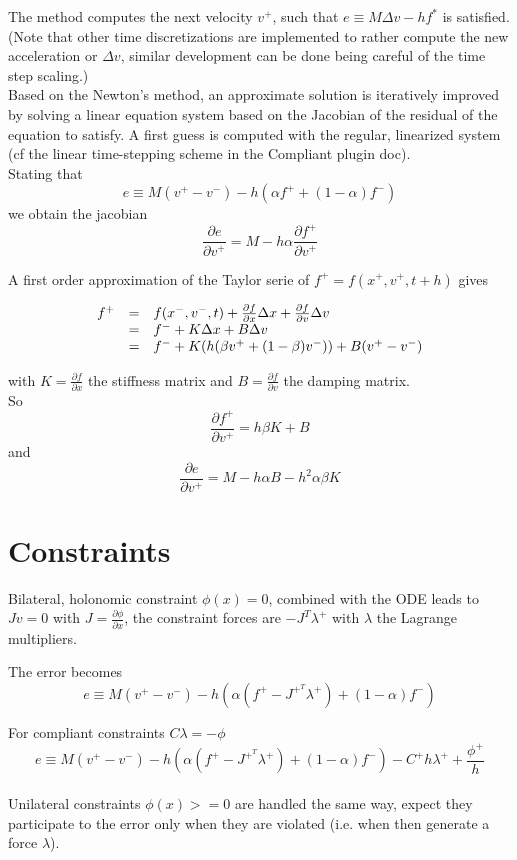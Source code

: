 \documentclass{article}
\newcommand{\ddd}[2]{\frac{\partial #1}{\partial #2}}
\newcommand{\p}[1]{#1^{+}}
\newcommand{\m}[1]{#1^{-}}
\newcommand{\s}[1]{#1^{*}}
\newcommand{\xp}{\p{x}}
\newcommand{\xm}{\m{x}}
\newcommand{\vp}{\p{v}}
\newcommand{\vm}{\m{v}}
\newcommand{\fp}{\p{f}}
\newcommand{\fm}{\m{f}}
\newcommand{\fs}{\s{f}}
\newcommand{\Dx}{\Delta x}
\newcommand{\Dv}{\Delta v}
\newcommand{\lambdap}{\p{\lambda}}
\newcommand{\phip}{\p{\phi}}
\newcommand{\JpT}{J^{+^T}}
\newcommand{\Cp}{\p{C}}
\begin{document}
The method computes the next velocity $\vp$, such that $e \equiv M\Dv-h\fs$ is satisfied.
(Note that other time discretizations are implemented to rather compute the new acceleration or $\Dv$, similar development can be done being careful of the time step scaling.)\\


Based on the Newton's method, an approximate solution is iteratively improved by solving a linear equation system based on the Jacobian of the residual of the equation to satisfy.
A first guess is computed with the regular, linearized system (cf the linear time-stepping scheme in the Compliant plugin doc). \\


Stating that \[ e \equiv M(\vp-\vm)-h(\alpha\fp+(1-\alpha)\fm)\] we obtain the jacobian \[ \ddd{e}{\vp}=M-h\alpha\ddd{\fp}{\vp}\]

A first order approximation of the Taylor serie of $\fp=f(\xp,\vp,t+h)$ gives

\[
   \begin{array}{r c l}
      \fp  & = & f(\xm,\vm,t)+\ddd{f}{x}\Dx+\ddd{f}{v}\Dv \\
           & = & \fm+K\Dx+B\Dv \\
           & = & \fm+K(h(\beta\vp+(1-\beta)\vm))+B(\vp-\vm)
   \end{array}
\]

with $K=\ddd{f}{x}$ the stiffness matrix and $B=\ddd{f}{v}$ the damping matrix. \\


So \[ \ddd{\fp}{\vp}=h\beta K+B\] and \[\ddd{e}{\vp}=M-h\alpha B-h^2\alpha\beta K\]


\section{Constraints}


Bilateral, holonomic constraint $\phi(x)=0$, combined with the ODE leads to $Jv=0$ with $J=\ddd{\phi}{x}$, the constraint forces are $-J^T\lambdap$ with $\lambda$ the Lagrange multipliers.

The error becomes \[ e \equiv M(\vp-\vm)-h(\alpha(\fp-\JpT\lambdap)+(1-\alpha)\fm)\]

For compliant constraints $C\lambda=-\phi$ \[ e \equiv M(\vp-\vm)-h(\alpha(\fp-\JpT\lambdap)+(1-\alpha)\fm)-\Cp h\lambdap+\frac{\phip}{h}\]
\\

Unilateral constraints $\phi(x)>=0$ are handled the same way, expect they participate to the error only when they are violated (i.e. when then generate a force $\lambda$).
\end{document}
